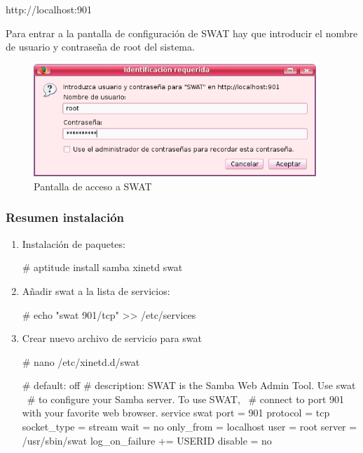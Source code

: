 \begin{listing}[numbers=none]
http://localhost:901
\end{listing}

Para entrar a la pantalla de configuración de SWAT hay que introducir el nombre de usuario y contraseña de root del sistema.

\begin{figure}[hbt!]
 \centering
 \includegraphics[width=0.95\textwidth]{Utils/swat_login.png}
 \caption{Pantalla de acceso a SWAT}
 \label{fig:swat_entrada}
\end{figure}

\newpage
\subsubsection{Resumen instalación}

\begin{enumerate}
 \item  Instalación de paquetes:
	\begin{listing}[style=consola, numbers=none]
# aptitude install samba xinetd swat
	\end{listing}

\item Añadir swat a la lista de servicios:
	\begin{listing}[style=consola, numbers=none]
# echo "swat		901/tcp" >> /etc/services
	\end{listing}

\item Crear nuevo archivo de servicio para swat
\begin{listing}[style=consola, numbers=none]
# nano /etc/xinetd.d/swat
\end{listing}

\begin{listing}[style=archivo]
# default: off
# description: SWAT is the Samba Web Admin Tool. Use swat \
#              to configure your Samba server. To use SWAT, \
#              connect to port 901 with your favorite web browser.
service swat
{
	port    = 901
	protocol = tcp
	socket_type     = stream
	wait    = no
	only_from = localhost
	user    = root
	server  = /usr/sbin/swat
	log_on_failure  += USERID
	disable = no
}
\end{listing}

\end{enumerate}
